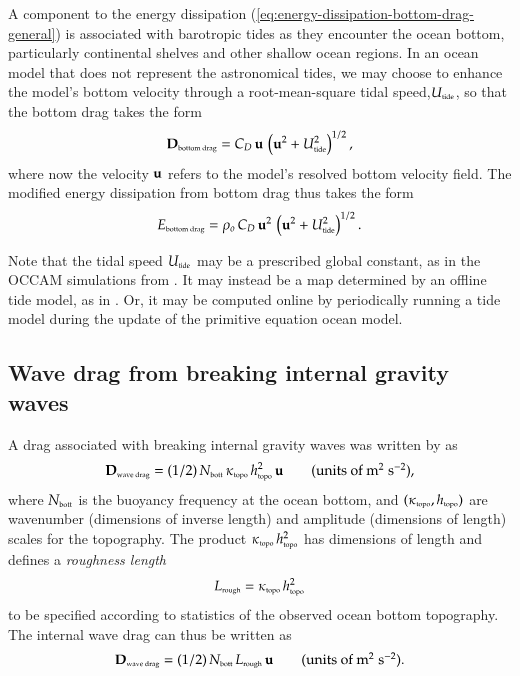 A component to the energy dissipation
(\ref{eq:energy-dissipation-bottom-drag-general}) is associated with
barotropic tides as they encounter the ocean bottom, particularly
continental shelves and other shallow ocean regions.  In an ocean
model that does not represent the astronomical tides, we may choose to
enhance the model's bottom velocity through a root-mean-square tidal
speed,$U_{\mbox{\tiny tide}}$, so that the bottom drag takes the form
\begin{equation}
  {\bf D}_{\mbox{\tiny bottom drag}} = 
  C_{D} \, {\bf u} \, \left( {\bf u}^{2} + U_{\mbox{\tiny tide}}^{2} \right)^{1/2},
\end{equation}
where now the velocity ${\bf u}$ refers to the model's resolved bottom
velocity field.  The modified energy dissipation from bottom drag
thus takes the form
\begin{equation}
 E_{\mbox{\tiny bottom drag}} =  \rho_{o} \, C_{D} \,  {\bf u}^{2} \, \left( {\bf u}^{2} + U_{\mbox{\tiny tide}}^{2} \right)^{1/2}.
\label{eq:energy-dissipation-bottom-drag-with-tides}
\end{equation}

Note that the tidal speed $U_{\mbox{\tiny tide}}$ may be a prescribed
global constant, as in the OCCAM simulations from \cite{Webbetal1998}.
It may instead be a map determined by an offline tide model, as in
\cite{Jayne_etal2001}.  Or, it may be computed online by periodically
running a tide model during the update of the primitive equation ocean
model.


\subsection{Wave drag from breaking internal gravity waves}

A drag associated with breaking internal gravity waves was written by
\cite{Jayne_etal2001} as
\begin{equation}
  {\bf D}_{\mbox{\tiny wave drag}} = (1/2) \, N_{\mbox{\tiny bott}}\,  
  \kappa_{\mbox{\tiny topo}} \, h_{\mbox{\tiny topo}}^{2} \, {\bf u}
\qquad \mbox{(units of $\mbox{m}^{2} \; \mbox{s}^{-2}$),}
\end{equation}
where $N_{\mbox{\tiny bott}}$ is the buoyancy frequency at the ocean
bottom, and $(\kappa_{\mbox{\tiny topo}},h_{\mbox{\tiny topo}})$ are
wavenumber (dimensions of inverse length) and amplitude (dimensions of
length) scales for the topography.  The product $\kappa_{\mbox{\tiny
    topo}} \, h_{\mbox{\tiny topo}}^{2}$ has dimensions of length and
defines a {\em roughness length}
\begin{equation}
  L_{\mbox{\tiny rough}} = \kappa_{\mbox{\tiny topo}} \, h_{\mbox{\tiny topo}}^{2}  
\label{eq:roughness-length}
\end{equation}
to be specified according to statistics of the observed ocean bottom
topography.  The internal wave drag can thus be written as
\begin{equation}
  {\bf D}_{\mbox{\tiny wave drag}} = (1/2) \, N_{\mbox{\tiny bott}}  \,  L_{\mbox{\tiny rough}} \, {\bf u}
\qquad \mbox{(units of $\mbox{m}^{2} \; \mbox{s}^{-2}$).}
\end{equation}

